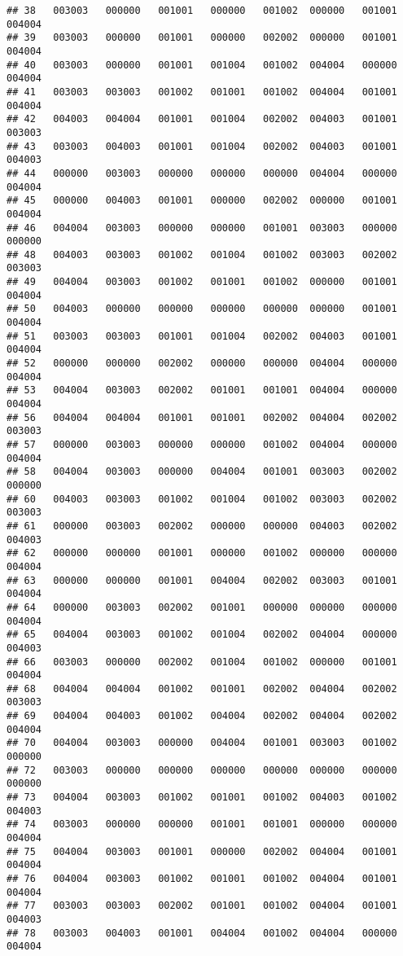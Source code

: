 \documentclass[
]{article}
\begin{document}
\begin{verbatim}
## 38   003003   000000   001001   000000   001002  000000   001001  004004
## 39   003003   000000   001001   000000   002002  000000   001001  004004
## 40   003003   000000   001001   001004   001002  004004   000000  004004
## 41   003003   003003   001002   001001   001002  004004   001001  004004
## 42   004003   004004   001001   001004   002002  004003   001001  003003
## 43   003003   004003   001001   001004   002002  004003   001001  004003
## 44   000000   003003   000000   000000   000000  004004   000000  004004
## 45   000000   004003   001001   000000   002002  000000   001001  004004
## 46   004004   003003   000000   000000   001001  003003   000000  000000
## 48   004003   003003   001002   001004   001002  003003   002002  003003
## 49   004004   003003   001002   001001   001002  000000   001001  004004
## 50   004003   000000   000000   000000   000000  000000   001001  004004
## 51   003003   003003   001001   001004   002002  004003   001001  004004
## 52   000000   000000   002002   000000   000000  004004   000000  004004
## 53   004004   003003   002002   001001   001001  004004   000000  004004
## 56   004004   004004   001001   001001   002002  004004   002002  003003
## 57   000000   003003   000000   000000   001002  004004   000000  004004
## 58   004004   003003   000000   004004   001001  003003   002002  000000
## 60   004003   003003   001002   001004   001002  003003   002002  003003
## 61   000000   003003   002002   000000   000000  004003   002002  004003
## 62   000000   000000   001001   000000   001002  000000   000000  004004
## 63   000000   000000   001001   004004   002002  003003   001001  004004
## 64   000000   003003   002002   001001   000000  000000   000000  004004
## 65   004004   003003   001002   001004   002002  004004   000000  004003
## 66   003003   000000   002002   001004   001002  000000   001001  004004
## 68   004004   004004   001002   001001   002002  004004   002002  003003
## 69   004004   004003   001002   004004   002002  004004   002002  004004
## 70   004004   003003   000000   004004   001001  003003   001002  000000
## 72   003003   000000   000000   000000   000000  000000   000000  000000
## 73   004004   003003   001002   001001   001002  004003   001002  004003
## 74   003003   000000   000000   001001   001001  000000   000000  004004
## 75   004004   003003   001001   000000   002002  004004   001001  004004
## 76   004004   003003   001002   001001   001002  004004   001001  004004
## 77   003003   003003   002002   001001   001002  004004   001001  004003
## 78   003003   004003   001001   004004   001002  004004   000000  004004

\end{verbatim}
\end{document}

